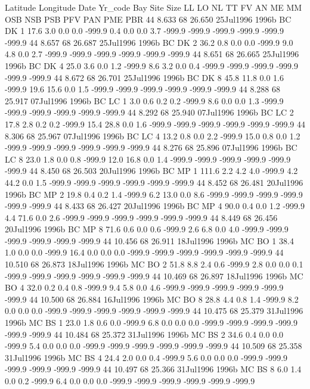 Latitude	Longitude	Date	Yr_code	Bay	Site	Size	LL	LO	NL	TT	FV	AN	ME	MM	OSB	NSB	PSB	PFV	PAN	PME	PBR
44 8.633	68 26.650	25Jul1996	1996b	BC	DK	1	17.6	3.0	0.0	0.0	-999.9	0.4	0.0	0.0	3.7	-999.9	-999.9	-999.9	-999.9	-999.9	-999.9
44 8.657	68 26.687	25Jul1996	1996b	BC	DK	2	36.2	0.8	0.0	0.0	-999.9	9.0	4.8	0.0	2.7	-999.9	-999.9	-999.9	-999.9	-999.9	-999.9
44 8.651	68 26.665	25Jul1996	1996b	BC	DK	4	25.0	3.6	0.0	1.2	-999.9	8.6	3.2	0.0	0.4	-999.9	-999.9	-999.9	-999.9	-999.9	-999.9
44 8.672	68 26.701	25Jul1996	1996b	BC	DK	8	45.8	11.8	0.0	1.6	-999.9	19.6	15.6	0.0	1.5	-999.9	-999.9	-999.9	-999.9	-999.9	-999.9
44 8.288	68 25.917	07Jul1996	1996b	BC	LC	1	3.0	0.6	0.2	0.2	-999.9	8.6	0.0	0.0	1.3	-999.9	-999.9	-999.9	-999.9	-999.9	-999.9
44 8.292	68 25.940	07Jul1996	1996b	BC	LC	2	17.8	2.8	0.2	0.2	-999.9	15.4	28.8	0.0	1.6	-999.9	-999.9	-999.9	-999.9	-999.9	-999.9
44 8.306	68 25.967	07Jul1996	1996b	BC	LC	4	13.2	0.8	0.0	2.2	-999.9	15.0	0.8	0.0	1.2	-999.9	-999.9	-999.9	-999.9	-999.9	-999.9
44 8.276	68 25.896	07Jul1996	1996b	BC	LC	8	23.0	1.8	0.0	0.8	-999.9	12.0	16.8	0.0	1.4	-999.9	-999.9	-999.9	-999.9	-999.9	-999.9
44 8.450	68 26.503	20Jul1996	1996b	BC	MP	1	111.6	2.2	4.2	4.0	-999.9	4.2	44.2	0.0	1.5	-999.9	-999.9	-999.9	-999.9	-999.9	-999.9
44 8.452	68 26.481	20Jul1996	1996b	BC	MP	2	19.8	0.4	0.2	1.4	-999.9	6.2	13.0	0.0	8.6	-999.9	-999.9	-999.9	-999.9	-999.9	-999.9
44 8.433	68 26.427	20Jul1996	1996b	BC	MP	4	90.0	0.4	0.0	1.2	-999.9	4.4	71.6	0.0	2.6	-999.9	-999.9	-999.9	-999.9	-999.9	-999.9
44 8.449	68 26.456	20Jul1996	1996b	BC	MP	8	71.6	0.6	0.0	0.6	-999.9	2.6	6.8	0.0	4.0	-999.9	-999.9	-999.9	-999.9	-999.9	-999.9
44 10.456	68 26.911	18Jul1996	1996b	MC	BO	1	38.4	1.0	0.0	0.0	-999.9	16.4	0.0	0.0	0.0	-999.9	-999.9	-999.9	-999.9	-999.9	-999.9
44 10.510	68 26.873	18Jul1996	1996b	MC	BO	2	51.8	8.8	2.4	0.6	-999.9	2.8	0.0	0.0	0.1	-999.9	-999.9	-999.9	-999.9	-999.9	-999.9
44 10.469	68 26.897	18Jul1996	1996b	MC	BO	4	32.0	0.2	0.4	0.8	-999.9	9.4	5.8	0.0	4.6	-999.9	-999.9	-999.9	-999.9	-999.9	-999.9
44 10.500	68 26.884	16Jul1996	1996b	MC	BO	8	28.8	4.4	0.8	1.4	-999.9	8.2	0.0	0.0	0.0	-999.9	-999.9	-999.9	-999.9	-999.9	-999.9
44 10.475	68 25.379	31Jul1996	1996b	MC	BS	1	23.0	1.8	0.6	0.0	-999.9	6.8	0.0	0.0	0.0	-999.9	-999.9	-999.9	-999.9	-999.9	-999.9
44 10.484	68 25.372	31Jul1996	1996b	MC	BS	2	34.6	0.4	0.0	0.0	-999.9	5.4	0.0	0.0	0.0	-999.9	-999.9	-999.9	-999.9	-999.9	-999.9
44 10.509	68 25.358	31Jul1996	1996b	MC	BS	4	24.4	2.0	0.0	0.4	-999.9	5.6	0.0	0.0	0.0	-999.9	-999.9	-999.9	-999.9	-999.9	-999.9
44 10.497	68 25.366	31Jul1996	1996b	MC	BS	8	6.0	1.4	0.0	0.2	-999.9	6.4	0.0	0.0	0.0	-999.9	-999.9	-999.9	-999.9	-999.9	-999.9
